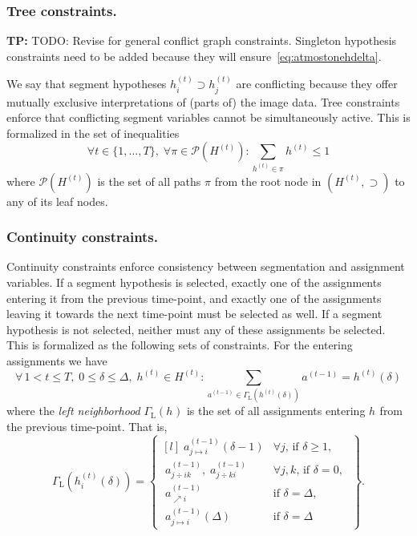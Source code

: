 \documentclass[a4paper]{article}
\newcommand{\TP}[1]{{\color{Red}\sc \textbf{TP:} #1}{}}
\newcommand{\set}[1]{\ensuremath{\{#1\}}}
\newcommand{\hypset}[1]{\ensuremath{H^{(#1)}}\xspace}
\newcommand{\Hypt}{\hypset{t}}
\newcommand{\hypti}[2][t]{\ensuremath{h^{(#1)}_{#2}}\xspace}
\newcommand{\vhset}[1]{\hypset{#1}}
\newcommand{\Ht}[1][t]{\vhset{#1}}
\newcommand{\vh}[1][]{\ensuremath{h_{#1}}\xspace}
\newcommand{\vht}[1][t]{\ensuremath{h^{(#1)}}\xspace}
\newcommand{\vhtd}[2][t]{\ensuremath{h^{(#1)}\left({#2}\right)}\xspace}
\newcommand{\vhtid}[3][t]{\ensuremath{h^{(#1)}_{#2}\left({#3}\right)}\xspace}
\newcommand{\Paths}[1]{\ensuremath{\mathcal{P}(#1)}\xspace}
\newcommand{\Path}{\ensuremath{\pi}\xspace}
\newcommand{\vat}[1][t]{\ensuremath{a^{(#1)}}\xspace}
\newcommand{\vamd}[4]{\ensuremath{a^{(#1)}_{#2\mapsto#3}\left(#4\right)}\xspace}
\newcommand{\vad}[3]{\ensuremath{a^{(#1)}_{#2\div#3}}\xspace}
\newcommand{\vaa}[2]{\ensuremath{a^{(#1)}_{\nearrow#2}}\xspace}
\newcommand{\Gl}[1]{\ensuremath{\Gamma_{\text{L}}\left(#1\right)}\xspace}
\begin{document}
\subsubsection{Tree constraints.}
%
%
\TP{TODO: Revise for general conflict graph constraints. Singleton hypothesis constraints need to be added because they will ensure~\eqref{eq:atmostonehdelta}.}

We say that segment hypotheses $\hypti{i} \supset \hypti{j}$ are conflicting because they offer mutually exclusive interpretations of (parts of) the image data.
Tree constraints enforce that conflicting segment variables cannot be simultaneously active.
This is formalized in the set of inequalities
\begin{equation}\label{eq:treeconstraints}
  \forall t \in \set{1, \dots, T},\;
  \forall \Path \in \Paths{\Ht}:
  \sum_{\vht \in \Path} \vht \leq 1
\end{equation}
where \Paths{\Ht} is the set of all paths \Path from the root node in $(\Hypt,\supset)$ to any of its leaf nodes.
%
%
\subsubsection{Continuity constraints.}
%
%
Continuity constraints enforce consistency between segmentation and assignment variables.
If a segment hypothesis is selected,
   exactly one of the assignments entering it from the previous time-point,
   and exactly one of the assignments leaving it towards the next time-point must be selected as well.
If a segment hypothesis is not selected, neither must any of these assignments be selected.
This is formalized as the following sets of constraints.
For the entering assignments we have
\begin{equation}\label{eq:contenter}
  \forall\, 1 < t \le T,\;
  0 \le \delta \le \Delta,\;
  \vht \in \Ht:
    \sum_{\vat[t-1] \in \Gl{\vhtd{\delta}}} \vat[t-1]
  = \vhtd{\delta}
\end{equation}
where the \emph{left neighborhood} \Gl{\vh} is the set of all assignments entering \vh from the previous time-point.
That is,
\begin{equation}
	\Gl{\vhtid{i}{\delta}}
	= \begin{Bmatrix*}[l]
			\; \vamd{t-1}{j}{i}{\delta-1}            & \forall j \text{, if } \delta \ge 1, \\[4mm]
			\; \vad{t-1}{j}{ik},\; \vad{t-1}{j}{ki}  & \forall j, k \text{, if } \delta = 0,\; \\[4mm]
			\; \vaa{t-1}{i}                          & \text{if } \delta = \Delta, \\[4mm]
			\; \vamd{t-1}{j}{i}{\Delta}              & \text{if } \delta = \Delta
		\end{Bmatrix*}.
\end{equation}
%
\end{document}
